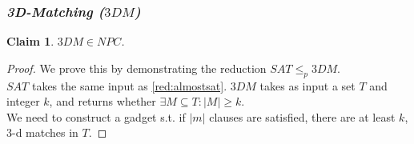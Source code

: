 \documentclass{article}
\newtheorem{claim}[theorem]{Claim}
\theoremstyle{definition}
\begin{document}
\subsubsection{\textit{3D-Matching ($3DM$)}}
	\begin{claim}
		$3DM \in NPC$.
	\end{claim}
	
	\begin{proof}
		We prove this by demonstrating the reduction $SAT \leq_p 3DM$.\\
		$SAT$ takes the same input as \ref{red:almostsat}. $3DM$ takes as input a set $T$ and integer $k$, and returns whether $\exists M \subseteq T : |M| \geq k$.\\
		We need to construct a gadget s.t. if $|m|$ clauses are satisfied, there are at least $k$, 3-d matches in $T$.
	\end{proof}
\end{document}
